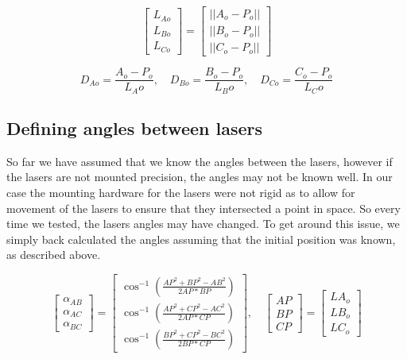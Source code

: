 \documentclass[a4paper]{article}
\begin{document}
\begin{equation}
\begin{bmatrix}
L_{Ao}\\ L_{Bo} \\ L_{Co}
\end{bmatrix} = \begin{bmatrix}
||A_o - P_o|| \\ ||B_o - P_o|| \\||C_o - P_o|| 
\end{bmatrix}
\end{equation}

\begin{equation}
D_{Ao} = \frac{A_o-P_o}{L_Ao}, \quad D_{Bo} = \frac{B_o-P_o}{L_Bo}, \quad D_{Co} = \frac{C_o-P_o}{L_Co}
\end{equation}

\subsection{Defining angles between lasers}
So far we have assumed that we know the angles between the lasers, however if the lasers are not mounted precision, the angles may not be known well. In our case the mounting hardware for the lasers were not rigid as to allow for movement of the lasers to ensure that they intersected a point in space. So every time we tested, the lasers angles may have changed. To get around this issue, we simply back calculated the angles assuming that the initial position was known, as described above.  

\begin{equation}
\begin{bmatrix}
\alpha_{AB}\\ \alpha_{AC} \\ \alpha_{BC}
\end{bmatrix} = \begin{bmatrix} \cos^{-1}(\frac{AP^2+BP^2-AB^2}{2AP*BP}) \\ \cos^{-1}(\frac{AP^2+CP^2-AC^2}{2AP*CP}) \\ \cos^{-1}(\frac{BP^2+CP^2-BC^2}{2BP*CP})
\end{bmatrix}, \quad
\begin{bmatrix} AP\\BP\\CP
\end{bmatrix} = \begin{bmatrix} LA_o\\LB_o\\LC_o
\end{bmatrix}
\end{equation}
\end{document}
